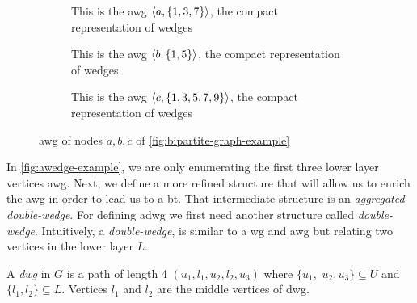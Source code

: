 \begin{figure}[htp!]
\begin{subfigure}[t]{0.3\textwidth}
\centering
{}
\caption[\acrshort{awg} on $a$]{This is the \acrshort{awg} $\left\langle a, \{1,3,7\}\right\rangle$, the compact representation of wedges}
\label{fig:awedge-example-a}
\end{subfigure}\hfill
\begin{subfigure}[t]{0.3\textwidth}
\centering
{}
\caption[\acrshort{awg} on $b$]{This is the \acrshort{awg} $\left\langle b, \{1,5\}\right\rangle$, the compact representation of wedges}
\label{fig:awedge-example-b}
\end{subfigure}\hfill
\begin{subfigure}[t]{0.3\textwidth}
\centering
{}
\caption[\acrshort{awg} on $c$]{This is the \acrshort{awg} $\left\langle c, \{1,3,5,7,9\}\right\rangle$, the compact representation of wedges}
\label{fig:awedge-example-c}
\end{subfigure}
\caption[{[\acrshort{iebt}] Definitions Examples \acrlong{awg}}]{\acrlong{awg} of nodes $a,b,c$ of \autoref{fig:bipartite-graph-example}}
\label{fig:awedge-example}
\end{figure}

In \autoref{fig:awedge-example}, we are only enumerating the first three lower layer vertices \acrshort{awg}.
Next, we define a more refined structure that will allow us to enrich the \acrshort{awg} in order to lead us to a \acrshort{bt}. 
That intermediate structure is an \emph{aggregated double-wedge}. For defining \acrshort{adwg} we first need another structure called \emph{double-wedge}. Intuitively, a \emph{double-wedge}, is similar to a \acrshort{wg} and \acrshort{awg} but relating two vertices in the lower layer $L$.

\begin{definition}
A \textit{\acrfull{dwg}} in $G$ is a path of length 4 $(u_1,l_1,u_2,l_2,u_3)$ where  $\{u_1,$ $u_2,u_3\}\subseteq U$ and $\{l_1,l_2\}\subseteq L$. Vertices $l_1$ and $l_2$ are the middle vertices of \acrshort{dwg}. 
\end{definition}

